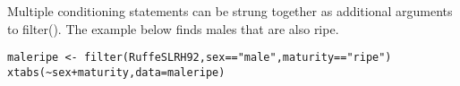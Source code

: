 \begin{frame}[fragile]
Multiple conditioning statements can be strung together as additional arguments to filter(). The example below finds males that are also ripe.

\begin{framed}
\begin{verbatim}
maleripe <- filter(RuffeSLRH92,sex=="male",maturity=="ripe")
xtabs(~sex+maturity,data=maleripe)
\end{verbatim}
\end{framed}

\end{frame}
